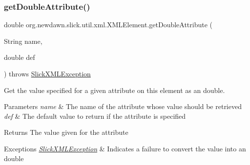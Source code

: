 \subsubsection{\texorpdfstring{get\+Double\+Attribute()}{getDoubleAttribute()}\hspace{0.1cm}{\footnotesize\ttfamily [2/2]}}
{\footnotesize\ttfamily double org.\+newdawn.\+slick.\+util.\+xml.\+X\+M\+L\+Element.\+get\+Double\+Attribute (\begin{DoxyParamCaption}\item[{String}]{name,  }\item[{double}]{def }\end{DoxyParamCaption}) throws \mbox{\hyperlink{classorg_1_1newdawn_1_1slick_1_1util_1_1xml_1_1_slick_x_m_l_exception}{Slick\+X\+M\+L\+Exception}}\hspace{0.3cm}{\ttfamily [inline]}}

Get the value specified for a given attribute on this element as an double.


\begin{DoxyParams}{Parameters}
{\em name} & The name of the attribute whose value should be retrieved \\
\hline
{\em def} & The default value to return if the attribute is specified \\
\hline
\end{DoxyParams}
\begin{DoxyReturn}{Returns}
The value given for the attribute 
\end{DoxyReturn}

\begin{DoxyExceptions}{Exceptions}
{\em \mbox{\hyperlink{classorg_1_1newdawn_1_1slick_1_1util_1_1xml_1_1_slick_x_m_l_exception}{Slick\+X\+M\+L\+Exception}}} & Indicates a failure to convert the value into an double \\
\hline
\end{DoxyExceptions}

